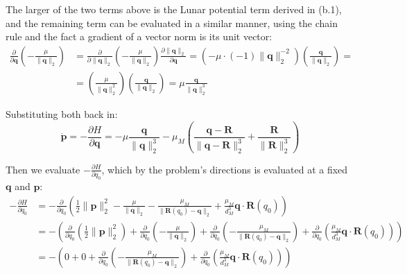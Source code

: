 \documentclass[titlepage]{article}
\begin{document}
The larger of the two terms above is the Lunar potential term derived in (b.1), and the remaining term can be evaluated in a similar manner, using the chain rule and the fact a gradient of a vector norm is its unit vector:
\begin{equation}
	\begin{split}
		\frac{\partial}{\partial\boldsymbol{q}}\left(-\frac{\mu}{\|\boldsymbol{q}\|_2}\right)&=\frac{\partial}{\partial\|\boldsymbol{q}\|_2}\left(-\frac{\mu}{\|\boldsymbol{q}\|_2}\right)\frac{\partial\|\boldsymbol{q}\|_2}{\partial\boldsymbol{q}}=\left(-\mu\cdot(-1)\|\boldsymbol{q}\|_2^{-2}\right)\left(\frac{\boldsymbol{q}}{\|\boldsymbol{q}\|_2}\right)= \\
		&=\left(\frac{\mu}{\|\boldsymbol{q}\|_2^2}\right)\left(\frac{\boldsymbol{q}}{\|\boldsymbol{q}\|_2}\right)=\mu\frac{\boldsymbol{q}}{\|\boldsymbol{q}\|_2^3}
	\end{split}
\end{equation}

Substituting both back in:
\begin{equation}
	\dot{\boldsymbol{p}}=-\frac{\partial H}{\partial\boldsymbol{q}}=-\mu\frac{\boldsymbol{q}}{\|\boldsymbol{q}\|_2^3}-\mu_M\left(\frac{\boldsymbol{q}-\boldsymbol{R}}{\|\boldsymbol{q}-\boldsymbol{R}\|_2^3}+\frac{\boldsymbol{R}}{\|\boldsymbol{R}\|_2^3}\right)
\end{equation}

Then we evaluate $-\frac{\partial H}{\partial q_0}$, which by the problem's directions is evaluated at a fixed $\boldsymbol{q}$ and $\boldsymbol{p}$:
\begin{equation}
	\begin{split}
		-\frac{\partial H}{\partial q_0}&=-\frac{\partial}{\partial q_0}\left(\frac{1}{2}\|\boldsymbol{p}\|_2^2-\frac{\mu}{\|\boldsymbol{q}\|_2}-\frac{\mu_M}{\|\boldsymbol{R}(q_0)-\boldsymbol{q}\|_2}+\frac{\mu_M}{d_M^3}\boldsymbol{q}\cdot\boldsymbol{R}(q_0)\right) \\
		&=-\left(\frac{\partial}{\partial q_0}\left(\frac{1}{2}\|\boldsymbol{p}\|_2^2\right)+\frac{\partial}{\partial q_0}\left(-\frac{\mu}{\|\boldsymbol{q}\|_2}\right)+\frac{\partial}{\partial q_0}\left(-\frac{\mu_M}{\|\boldsymbol{R}(q_0)-\boldsymbol{q}\|_2}\right)+\frac{\partial}{\partial q_0}\left(\frac{\mu_M}{d_M^3}\boldsymbol{q}\cdot\boldsymbol{R}(q_0)\right)\right) \\
		&=-\left(0+0+\frac{\partial}{\partial q_0}\left(-\frac{\mu_M}{\|\boldsymbol{R}(q_0)-\boldsymbol{q}\|_2}\right)+\frac{\partial}{\partial q_0}\left(\frac{\mu_M}{d_M^3}\boldsymbol{q}\cdot\boldsymbol{R}(q_0)\right)\right)
	\end{split}
\end{equation}
\end{document}
